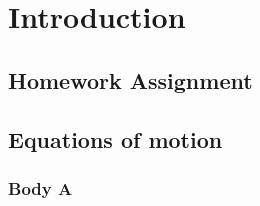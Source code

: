 \section{Introduction}
\blindtext

\begin{multicols}{2}
\section{Homework Assignment}

\noindent {}
\blindtext

\subsection{Equations of motion}
\blindtext

\subsubsection{Body A}
\blindtext

\end{multicols}